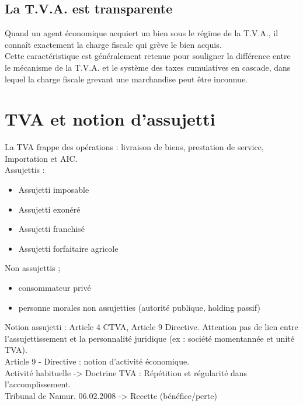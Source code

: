 \documentclass{book}
\begin{document}
\section{La T.V.A. est transparente}

Quand un agent économique acquiert un bien sous le régime de la T.V.A., il connaît
exactement la charge fiscale qui grève le bien acquis.\\

Cette caractéristique est généralement retenue pour souligner la différence entre le mécanisme
de la T.V.A. et le système des taxes cumulatives en cascade, dans lequel la charge fiscale
grevant une marchandise peut être inconnue.\\

\chapter{TVA et notion d'assujetti}

La TVA frappe des opérations : livraison de biens, prestation de service, Importation et AIC.\\	

Assujettis :
\begin{itemize}
\item Assujetti imposable
\item Assujetti exonéré
\item Assujetti franchisé
\item Assujetti forfaitaire agricole
\end{itemize}

Non assujettis ;
\begin{itemize}
\item consommateur privé
\item personne morales non assujetties (autorité publique, holding passif)
\end{itemize}

\null

Notion assujetti : Article 4 CTVA, Article 9 Directive. Attention pas de lien entre l'assujettissement et la personnalité juridique (ex : société momentannée et unité TVA).\\

Article 9 - Directive : notion d'activité économique.\\
Activité habituelle -> Doctrine TVA : Répétition et régularité dans l'accomplissement.\\

Tribunal de Namur. 06.02.2008 -> Recette (bénéfice/perte)\\
\end{document}
